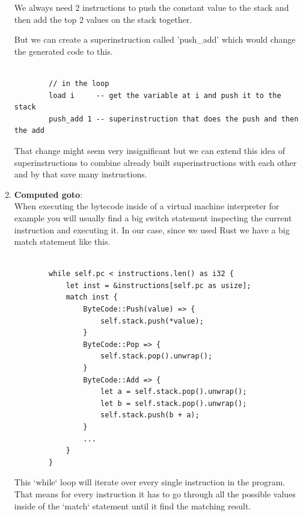 \documentclass{article}
\begin{document}
\begin{enumerate}
\begin{verbatim}
        \end{verbatim}

        We always need 2 instructions to push the constant value to the stack and then add the top
        2 values on the stack together.

        But we can create a superinstruction called 'push\_add' which would change the generated
        code to this.

        \begin{verbatim}

        // in the loop
        load i     -- get the variable at i and push it to the stack
        push_add 1 -- superinstruction that does the push and then the add

        \end{verbatim}

        That change might seem very insignificant but we can extend this idea
        of superinstructions to combine already built superinstructions with
        each other and by that save many instructions.


    \item \textbf{Computed goto}:\\
    \label{it:goto}
        When executing the bytecode inside of a virtual machine interpreter for
        example you will usually find a big switch statement inspecting the
        current instruction and executing it. In our case, since we used Rust
        we have a big match statement like this.

        \begin{verbatim}

        while self.pc < instructions.len() as i32 {
            let inst = &instructions[self.pc as usize];
            match inst {
                ByteCode::Push(value) => {
                    self.stack.push(*value);
                }
                ByteCode::Pop => {
                    self.stack.pop().unwrap();
                }
                ByteCode::Add => {
                    let a = self.stack.pop().unwrap();
                    let b = self.stack.pop().unwrap();
                    self.stack.push(b + a);
                }
                ...
            }
        }
        \end{verbatim}

        This `while` loop will iterate over every single instruction in the program. That means
        for every instruction it has to go through all the possible values inside of the `match`
        statement until it find the matching result.


\end{enumerate}
\end{document}

